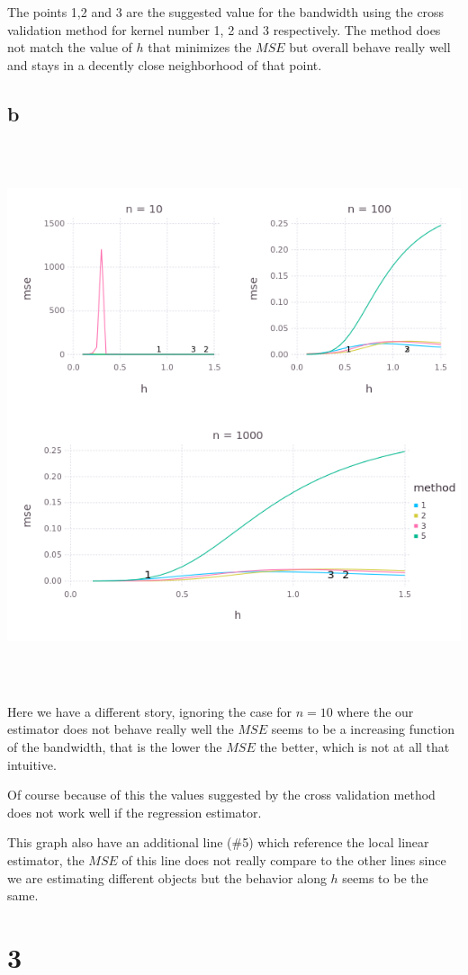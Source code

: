 \documentclass{article}
\begin{document}
The points 1,2 and 3 are the suggested value for the bandwidth using the cross
validation method for kernel number 1, 2 and 3 respectively. The method does not
match the value of $h$ that minimizes the $MSE$ but overall behave really well and stays
in a decently close neighborhood of that point.

\subsection{b}

\begin{center}
\includegraphics[width=16cm, height=16cm]{Q2-b.png}
\end{center}

Here we have a different story, ignoring the case for $n = 10$ where the our estimator
does not behave really well the $MSE$ seems to be a increasing function of the bandwidth,
that is the lower the $MSE$ the better, which is not at all that intuitive.

Of course because of this the values suggested by the cross validation method does not
work well if the regression estimator.

This graph also have an additional line (\#5) which reference the local linear estimator,
the $MSE$ of this line does not really compare to the other lines since we are estimating
different objects but the behavior along $h$ seems to be the same.

\section{3}
\end{document}
